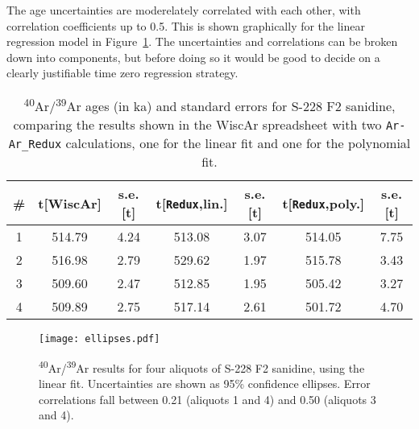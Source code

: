 \documentclass{article}
\begin{document}
The age uncertainties are moderelately correlated with each other,
with correlation coefficients up to 0.5. This is shown graphically for
the linear regression model in Figure~\ref{fig:ellipses}. The
uncertainties and correlations can be broken down into components, but
before doing so it would be good to decide on a clearly justifiable
time zero regression strategy.

\begin{table}[!ht]
  \centering
  \captionsetup{width=11cm}
  \begin{tabular}{ccc|cc|cc}
    \# & t[WiscAr] & s.e.[t] &
    t[\texttt{Redux},lin.] & s.e.[t] &
    t[\texttt{Redux},poly.] & s.e.[t] \\ \hline
    1 & 514.79 & 4.24 & 513.08 & 3.07 & 514.05 & 7.75 \\
    2 & 516.98 & 2.79 & 529.62 & 1.97 & 515.78 & 3.43 \\
    3 & 509.60 & 2.47 & 512.85 & 1.95 & 505.42 & 3.27 \\
    4 & 509.89 & 2.75 & 517.14 & 2.61 & 501.72 & 4.70
  \end{tabular}
  \caption{\textsuperscript{40}Ar/\textsuperscript{39}Ar ages (in ka)
    and standard errors for S-228 F2 sanidine, comparing the results
    shown in the WiscAr spreadsheet with two \texttt{Ar-Ar\_Redux}
    calculations, one for the linear fit and one for the polynomial
    fit.}
  \label{tab:results}
\end{table}

\begin{figure}[!ht]
  \centering
  \captionsetup{width=10cm}
  \texttt{[image: ellipses.pdf]}
  \caption{\textsuperscript{40}Ar/\textsuperscript{39}Ar results for
    four aliquots of S-228 F2 sanidine, using the linear fit.
    Uncertainties are shown as 95\% confidence ellipses. Error
    correlations fall between 0.21 (aliquots 1 and 4) and 0.50
    (aliquots 3 and 4).}
  \label{fig:ellipses}
\end{figure}



\end{document}
